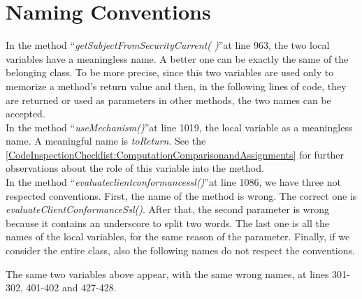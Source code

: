 \documentclass[\mainpath/main]{subfiles}
\begin{document}
\section{Naming Conventions}
\label{CodeInspectionChecklist:NamingConventions}
In the method \textquotedblleft \textit{getSubjectFromSecurityCurrent( )}\textquotedblright at line 963, the two local variables have a meaningless name. A better one can be exactly the same of the belonging class.
To be more precise, since this two variables are used only to memorize a method's return value and then, in the following lines of code, they are returned or used as parameters in other methods, the two names can be accepted.\\
In the method \textquotedblleft \textit{useMechanism(\textellipsis)}\textquotedblright at line 1019, the local variable as a meaningless name. A meaningful name is \textit{toReturn}.
See the \autoref{CodeInspectionChecklist:ComputationComparisonandAssignments} for further observations about the role of this variable into the method.\\
In the method \textquotedblleft \textit{evaluate\textunderscore client\textunderscore conformance\textunderscore ssl(\textellipsis)}\textquotedblright at line 1086, we have three not respected conventions. First, the name of the method is wrong. The correct one is \textit{evaluateClientConformanceSsl(\textellipsis)}. After that, the second parameter is wrong because it contains an underscore to split two words.
The last one is all the names of the local variables, for the same reason of the parameter.
Finally, if we consider the entire class, also the following names do not respect the conventions.
\begin{scriptsize}
	\centerline{The same two variables above appear, with the same wrong names, at lines 301-302, 401-402 and 427-428.}
\end{scriptsize}
\end{document}
